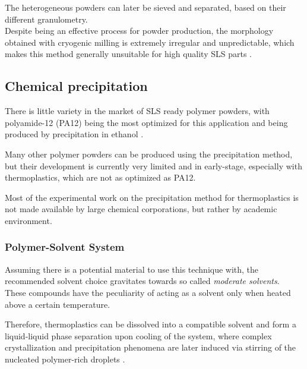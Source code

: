 \documentclass{article}
\begin{document}
    The heterogeneous powders can later be sieved and separated, based on their different granulometry. \\ 

    Despite being an effective process for powder production, the morphology obtained with cryogenic milling is extremely irregular 
    and unpredictable, which makes this method generally unsuitable for high quality SLS parts \autocite*{doi:10.1063/1.4918516}. 

    \subsection{Chemical precipitation \label{Chemical precipitation}}

    There is little variety in the market of SLS ready polymer powders, with polyamide-12 (PA12) being the most optimized for this 
    application and being produced by precipitation in ethanol \autocite*{DechetMaximilianA2020OtDo}.
    
    Many other polymer powders can be produced using the precipitation method, but their development is currently very limited 
    and in early-stage, especially with thermoplastics, which are not as optimized as PA12.
    
    Most of the experimental work on the precipitation method for thermoplastics is not made available by large chemical corporations, 
    but rather by academic environment. 

    \subsubsection{Polymer-Solvent System \label{polymer_solvent_system}}

    Assuming there is a potential material to use this technique with, the recommended solvent choice gravitates towards 
    so called \textit{moderate solvents}. \\
    
    These compounds have the peculiarity of acting as a solvent only when heated above a certain temperature. 

    Therefore, thermoplastics can be dissolved into a compatible solvent and form a liquid-liquid phase separation
    upon cooling of the system, where complex crystallization and precipitation phenomena are later induced via stirring of 
    the nucleated polymer-rich droplets \autocite*{DechetMaximilianA2020OtDo}.  \\ 
\end{document}
